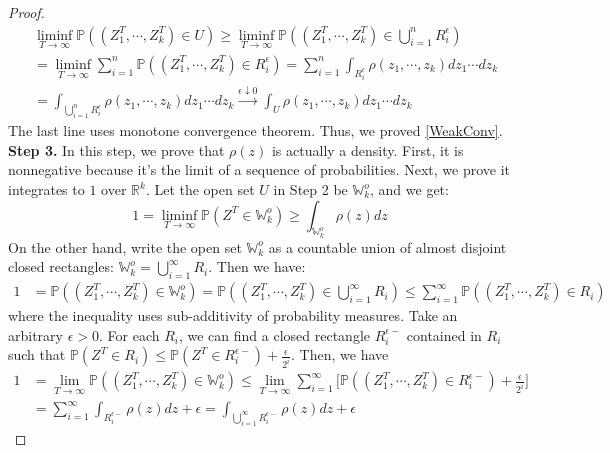 \begin{proof}
\begin{align*}
	&\liminf_{T\rightarrow\infty}\mathbb{P}((Z_{1}^{T},\cdots,Z_{k}^{T})\in U)\geqslant\liminf_{T\rightarrow\infty}\mathbb{P}((Z_{1}^{T},\cdots,Z_{k}^{T})\in \bigcup_{i=1}^{n}R_{i}^{\epsilon})\\
	&=\liminf_{T\rightarrow\infty}\sum_{i=1}^{n}\mathbb{P}((Z_{1}^{T},\cdots,Z_{k}^{T})\in R_{i}^{\epsilon})=\sum_{i=1}^{n}\int_{R_{i}^{\epsilon}}\rho(z_1,\cdots,z_{k})dz_{1}\cdots dz_{k}\\
	&=\int_{\bigcup_{i=1}^{n}R_{i}^{\epsilon}}\rho(z_1,\cdots,z_{k})dz_{1}\cdots dz_{k} \xrightarrow{\epsilon\downarrow 0} \int_{U}\rho(z_1,\cdots,z_{k})dz_{1}\cdots dz_{k}
\end{align*}
The last line uses monotone convergence theorem. Thus, we proved \ref{WeakConv}.\\
\textbf{Step 3. }In this step, we prove that $\rho(z)$ is actually a density. First, it is nonnegative because it's the limit of a sequence of probabilities. Next, we prove it integrates to $1$ over $\mathbb{R}^{k}$. Let the open set $U$ in Step 2 be $\mathbb{W}_{k}^{o}$, and we get: $$1=\liminf_{T\rightarrow\infty}\mathbb{P}(Z^{T}\in \mathbb{W}_{k}^{o})\geqslant \int_{\mathbb{W}_{k}^{o}}\rho(z)dz$$
On the other hand, write the open set $\mathbb{W}_{k}^{o}$ as a countable union of almost disjoint closed rectangles: $\mathbb{W}_{k}^{o}=\bigcup_{i=1}^{\infty}R_{i}$. Then we have:
\begin{align*}
	1&=\mathbb{P}((Z_{1}^{T},\cdots,Z_{k}^{T})\in \mathbb{W}_{k}^{o})=\mathbb{P}((Z_{1}^{T},\cdots,Z_{k}^{T})\in \bigcup_{i=1}^{\infty}R_{i})\leqslant\sum_{i=1}^{\infty}\mathbb{P}((Z_{1}^{T},\cdots,Z_{k}^{T})\in R_{i})
\end{align*}
where the inequality uses sub-additivity of probability measures. Take an arbitrary $\epsilon>0$. For each $R_{i}$, we can find a closed rectangle $R_{i}^{\epsilon-}$ contained in $R_{i}$ such that $\mathbb{P}(Z^{T}\in R_{i})\leqslant \mathbb{P}(Z^{T}\in R_{i}^{\epsilon-})+\frac{\epsilon}{2^{i}}$. Then, we have
\begin{align*}
	1&=\lim_{T\rightarrow\infty}\mathbb{P}((Z_{1}^{T},\cdots,Z_{k}^{T})\in \mathbb{W}_{k}^{o})\leqslant \lim_{T\rightarrow\infty}\sum_{i=1}^{\infty}\big[\mathbb{P}((Z_{1}^{T},\cdots,Z_{k}^{T})\in R_{i}^{\epsilon-})+\frac{\epsilon}{2^{i}}\big]\\
	&=\sum_{i=1}^{\infty}\int_{R_{i}^{\epsilon-}}\rho(z)dz+\epsilon=\int_{\bigcup_{i=1}^{\infty}R_{i}^{\epsilon-}}\rho(z)dz+\epsilon
\end{align*}

\end{proof}
